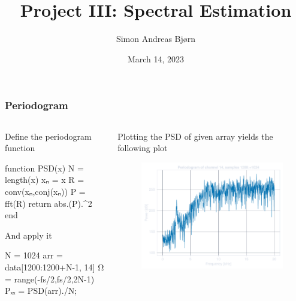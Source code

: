 \documentclass[compress]{beamer}
\title{Project III: Spectral Estimation}
\subtitle{}
\author{\Large Simon Andreas Bjørn}
\date{\large March 14, 2023}
\begin{document}
\begin{frame}
    \maketitle
\end{frame}

\begin{frame}[fragile] %
    \frametitle{Periodogram}
    \begin{columns}
        \begin{column}{0.5\textwidth}
            Define the periodogram function
            \begin{jllisting}[gobble=16]
                function PSD(x)
                    N = length(x) xₙ = x
                    R = conv(xₙ,conj(xₙ))
                    P = fft(R)
                    return abs.(P).^2
                end
            \end{jllisting}
            And apply it
            \begin{jllisting}[gobble=16]
                N = 1024
                arr = data[1200:1200+N-1, 14]
                Ω = range(-fs/2,fs/2,2N-1)
                Pₓₓ = PSD(arr)./N;
            \end{jllisting}
        \end{column}
        \begin{column}{0.5\textwidth}
            Plotting the PSD of given array yields the following plot
            \begin{figure}
                \includegraphics[width=\columnwidth]{"../1a.pdf"}
            \end{figure}
        \end{column}
    \end{columns}
\end{frame} 
\end{document}

